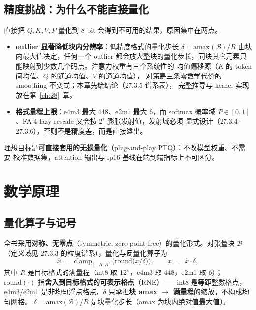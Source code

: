 \subsection{精度挑战：为什么不能直接量化}

直接把 $Q,K,V,P$ 量化到 8-bit 会得到不可用的结果，原因集中在两点。
\begin{itemize}[itemsep=2pt,topsep=2pt]
  \item \textbf{outlier 显著降低块内分辨率}：低精度格式的量化步长
        $\delta = \mathrm{amax}(\mathcal{B})/R$ 由块内最大值决定，任何一个 outlier
        都会放大整块的量化步长，同块其它元素只能映射到少数几个码点。注意力权重有三个系统性的
        均值偏移源（$K$ 的 token 间均值、$Q$ 的通道均值、$V$ 的通道均值），
        对策是三条零数学代价的 smoothing 不变式；本章先给结论（27.3.5 谱系表），
        完整推导与 kernel 实现放在第~\ref{ch:28}~章。
  \item \textbf{格式量程上限}：e4m3 最大 448、e2m1 最大 6，而 softmax 概率域
        $P \in [0,1]$、FA-4 lazy rescale 又会按 $2^{\tau}$ 膨胀发射值，发射域必须
        显式设计（27.3.4--27.3.6），否则不是精度差，而是直接溢出。
\end{itemize}

理想目标是\textbf{可直接套用的无损量化}（plug-and-play PTQ）：不改模型权重、不需要
校准数据集，attention 输出与 fp16 基线在端到端指标上不可区分。

\section{数学原理}

\subsection{量化算子与记号}

全书采用\textbf{对称、无零点}（symmetric, zero-point-free）的量化形式。对张量块
$\mathcal{B}$（定义域见 27.3.3 的粒度谱系），量化与反量化算子为
\begin{equation}
  \hat{x} \;=\; \mathrm{clamp}_{[-R,R]}\!\Big(\mathrm{round}\big(x / \delta\big)\Big),
  \qquad
  \tilde{x} \;=\; \hat{x} \cdot \delta,
  \label{eq:27-quant-op}
\end{equation}
其中 $R$ 是目标格式的满量程（int8 取 127，e4m3 取 448，e2m1 取 6）；
$\mathrm{round}(\cdot)$ 指\textbf{舍入到目标格式的可表示格点}（RNE）——int8 是等距整数格点，
e4m3/e2m1 是非均匀浮点格点，$\delta$ 只承担\textbf{块 amax $\to$ 满量程}的缩放，不构成均匀网格。
$\delta = \mathrm{amax}(\mathcal{B}) / R$ 是块量化步长（amax 为块内绝对值最大值）。

